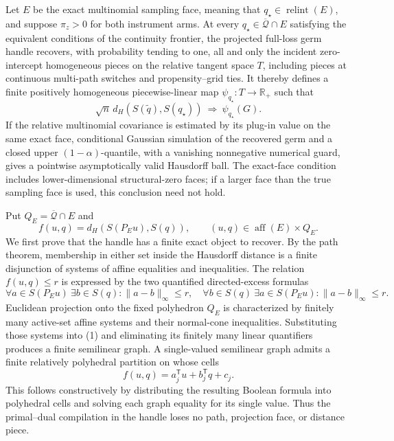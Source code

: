 Let \(E\) be the exact multinomial sampling face, meaning that \(q_\star\in\operatorname{relint}(E)\), and suppose \(\pi_z>0\) for both instrument arms.  At every \(q_\star\in\overline{\mathcal Q}\cap E\) satisfying the equivalent conditions of the continuity frontier, the projected full-loss germ handle recovers, with probability tending to one, all and only the incident zero-intercept homogeneous pieces on the relative tangent space \(T\), including pieces at continuous multi-path switches and propensity--grid ties.  It thereby defines a finite positively homogeneous piecewise-linear map \(\psi_{q_\star}:T\to\mathbb R_+\) such that
\[
\sqrt n\,d_H(S(\widetilde q),S(q_\star))\ \Rightarrow\ \psi_{q_\star}(G).
\]
If the relative multinomial covariance is estimated by its plug-in value on the same exact face, conditional Gaussian simulation of the recovered germ and a closed upper \((1-\alpha)\)-quantile, with a vanishing nonnegative numerical guard, gives a pointwise asymptotically valid Hausdorff ball.  The exact-face condition includes lower-dimensional structural-zero faces; if a larger face than the true sampling face is used, this conclusion need not hold.

Put \(Q_E=\overline{\mathcal Q}\cap E\) and
\[
f(u,q)=d_H(S(P_Eu),S(q)),\qquad (u,q)\in\operatorname{aff}(E)\times Q_E.
\]
We first prove that the handle has a finite exact object to recover.  By the path theorem, membership in either set inside the Hausdorff distance is a finite disjunction of systems of affine equalities and inequalities.  The relation \(f(u,q)\le r\) is expressed by the two quantified directed-excess formulas
\[
\forall a\in S(P_Eu)\ \exists b\in S(q):\|a-b\|_\infty\le r,
\quad
\forall b\in S(q)\ \exists a\in S(P_Eu):\|a-b\|_\infty\le r.
\tag{1}
\]
Euclidean projection onto the fixed polyhedron \(Q_E\) is characterized by finitely many active-set affine systems and their normal-cone inequalities.  Substituting those systems into (1) and eliminating its finitely many linear quantifiers produces a finite semilinear graph.  A single-valued semilinear graph admits a finite relatively polyhedral partition on whose cells
\[
f(u,q)=a_j^{\mathsf T}u+b_j^{\mathsf T}q+c_j.
\tag{2}
\]
This follows constructively by distributing the resulting Boolean formula into polyhedral cells and solving each graph equality for its single value.  Thus the primal--dual compilation in the handle loses no path, projection face, or distance piece.

